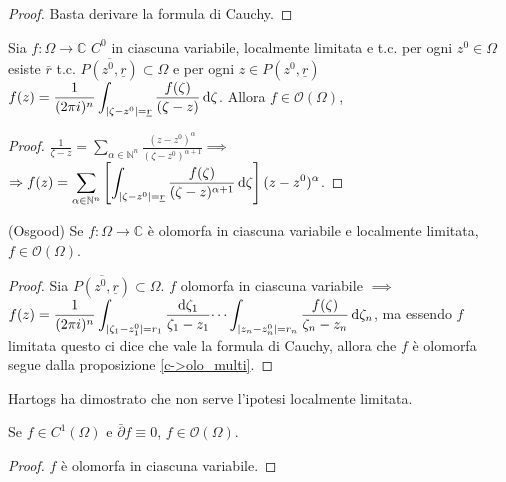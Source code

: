 \begin{proof}
  Basta derivare la formula di Cauchy.
\end{proof}

\begin{prop} \label{c->olo_multi}
  Sia $f: \Omega \longrightarrow \mathbb{C}$ $C^0$ in ciascuna variabile, localmente limitata e t.c. per ogni $z^0 \in \Omega$ esiste $\bar{r}$ t.c. $\overline{P(z^0, \underline{r})} \subset \Omega$ e per ogni $z \in P(z^0, \underline{r})$ $\displaystyle f(z)=\frac{1}{(2\pi i)^n} \int_{|\zeta-z^0|=\underline{r}} \frac{f(\zeta)}{(\zeta-z)}\mathop{}\!\mathrm{d}\zeta$. Allora $f \in \mathcal{O}(\Omega)$,
\end{prop}

\begin{proof}
  $\displaystyle \frac{1}{\zeta-z}=\sum_{\alpha \in \mathbb{N}^n} \frac{(z-z^0)^\alpha}{(\zeta-z^0)^{\alpha+1}} \implies$\\
  $\displaystyle \Rightarrow f(z)=\sum_{\alpha \in \mathbb{N}^n} \left[\int_{|\zeta-z^0|=\underline{r}} \frac{f(\zeta)}{(\zeta-z)^{\alpha+1}}\mathop{}\!\mathrm{d} \zeta\right](z-z^0)^\alpha$.
\end{proof}

\begin{cor}
  (Osgood) Se $f:\Omega \longrightarrow \mathbb{C}$ è olomorfa in ciascuna variabile e localmente limitata, $f \in \mathcal{O}(\Omega)$.
\end{cor}

\begin{proof}
  Sia $\overline{P(z^0, \underline{r})} \subset \Omega$. $f$ olomorfa in ciascuna variabile $\implies$ $\displaystyle f(z)=\frac{1}{(2\pi i)^n} \int_{|\zeta_1-z_1^0|=r_1} \frac{\mathop{}\!\mathrm{d} \zeta_1}{\zeta_1-z_1}\dots\int_{|z_n-z_n^0|=r_n}\frac{f(\zeta)}{\zeta_n-z_n}\mathop{}\!\mathrm{d}\zeta_n$, ma essendo $f$ limitata questo ci dice che vale la formula di Cauchy, allora che $f$ è olomorfa segue dalla proposizione \ref{c->olo_multi}.
\end{proof}

\begin{ftt}
  Hartogs ha dimostrato che non serve l'ipotesi localmente limitata.
\end{ftt}

\begin{cor}
  Se $f \in C^1(\Omega)$ e $\bar{\partial}f\equiv 0$, $f \in \mathcal{O}(\Omega)$.
\end{cor}

\begin{proof}
  $f$ è olomorfa in ciascuna variabile.
\end{proof}

